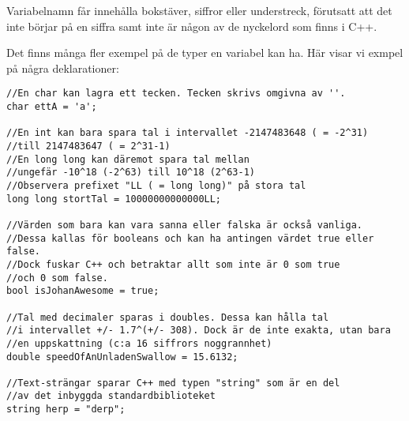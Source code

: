 Variabelnamn får innehålla bokstäver, siffror eller understreck, förutsatt att det inte börjar på en siffra samt inte är någon av de nyckelord som finns i C++.

Det finns många fler exempel på de typer en variabel kan ha. Här visar vi exmpel på några deklarationer:

\begin{lstlisting}
//En char kan lagra ett tecken. Tecken skrivs omgivna av ''.
char ettA = 'a';

//En int kan bara spara tal i intervallet -2147483648 ( = -2^31)
//till 2147483647 ( = 2^31-1)
//En long long kan däremot spara tal mellan 
//ungefär -10^18 (-2^63) till 10^18 (2^63-1)
//Observera prefixet "LL ( = long long)" på stora tal
long long stortTal = 10000000000000LL;

//Värden som bara kan vara sanna eller falska är också vanliga.
//Dessa kallas för booleans och kan ha antingen värdet true eller false.
//Dock fuskar C++ och betraktar allt som inte är 0 som true
//och 0 som false.
bool isJohanAwesome = true;

//Tal med decimaler sparas i doubles. Dessa kan hålla tal
//i intervallet +/- 1.7^(+/- 308). Dock är de inte exakta, utan bara
//en uppskattning (c:a 16 siffrors noggrannhet)
double speedOfAnUnladenSwallow = 15.6132;

//Text-strängar sparar C++ med typen "string" som är en del
//av det inbyggda standardbiblioteket
string herp = "derp";
\end{lstlisting}
